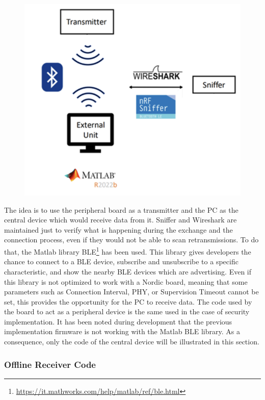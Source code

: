 \documentclass{Configuration_Files/PoliMi3i_thesis}
\begin{document}
\begin{figure}[H]
    \centering
    \includegraphics[scale=0.3]{Board Windows PC/1.png}
    \label{fig:nrf_connect_log}
\end{figure}

The idea is to use the peripheral board as a transmitter and the PC as the central device which would receive data from it. Sniffer and Wireshark are maintained just to verify what is happening during the exchange and the connection process, even if they would not be able to scan retransmissions. To do that, the Matlab library BLE\footnote{\url{https://it.mathworks.com/help/matlab/ref/ble.html}} has been used. This library gives developers the chance to connect to a BLE device, subscribe and unsubscribe to a specific characteristic, and show the nearby BLE devices which are advertising. Even if this library is not optimized to work with a Nordic board, meaning that some parameters such as Connection Interval, PHY, or Supervision Timeout cannot be set, this provides the opportunity for the PC to receive data. The code used by the board to act as a peripheral device is the same used in the case of security implementation. It has been noted during development that the previous implementation firmware is not working with the Matlab BLE library. As a consequence, only the code of the central device will be illustrated in this section.

\subsubsection{Offline Receiver Code}
\end{document}
